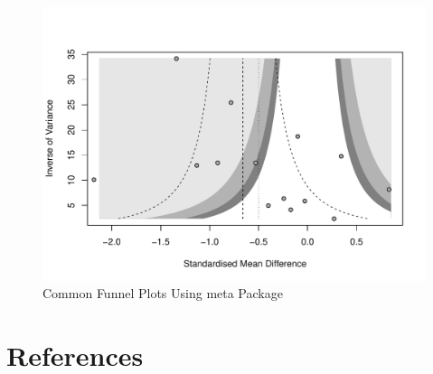 \documentclass[
  11pt,
]{article}
\begin{document}
\begin{figure}

{\centering \includegraphics{IntroToMA_pdf_files/figure-latex/funnel-plot-meta-1} 

}

\caption{Common Funnel Plots Using meta Package}\label{fig:funnel-plot-meta}
\end{figure}

\hypertarget{references}{%
\section*{References}\label{references}}
\end{document}
